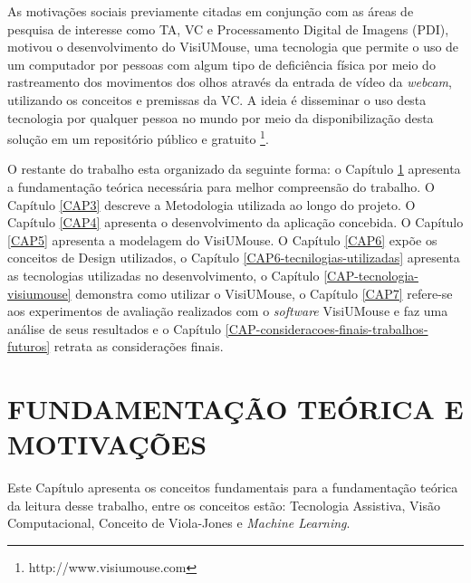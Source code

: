 As motivações sociais previamente citadas em conjunção com as áreas de pesquisa de interesse como TA, VC e Processamento Digital de Imagens (PDI), motivou o desenvolvimento do VisiUMouse, uma tecnologia que permite o uso de um computador por pessoas com algum tipo de deficiência física por meio do rastreamento dos movimentos dos olhos através da entrada de vídeo da \textit{webcam}, utilizando os conceitos e premissas da VC. A ideia é disseminar o uso desta tecnologia por qualquer pessoa no mundo por meio da disponibilização desta solução em um repositório público e gratuito \footnote{http://www.visiumouse.com}.



O restante do trabalho esta organizado da seguinte forma: o Capítulo \ref{CAP2} apresenta a fundamentação teórica necessária para melhor compreensão do trabalho. O Capítulo \ref{CAP3} descreve a Metodologia utilizada ao longo do projeto. O Capítulo \ref{CAP4} apresenta o desenvolvimento da aplicação concebida. O Capítulo \ref{CAP5} apresenta a modelagem do VisiUMouse. O Capítulo \ref{CAP6} expõe os conceitos de Design utilizados,  o Capítulo \ref{CAP6-tecnilogias-utilizadas} apresenta as tecnologias utilizadas no desenvolvimento, o Capítulo \ref{CAP-tecnologia-visiumouse} demonstra como utilizar o VisiUMouse, o Capítulo \ref{CAP7} refere-se aos experimentos de avaliação realizados com o \textit{software} VisiUMouse e faz uma análise de seus resultados e o Capítulo \ref{CAP-consideracoes-finais-trabalhos-futuros} retrata as considerações finais.


\chapter{FUNDAMENTAÇÃO TEÓRICA E MOTIVAÇÕES}\label{CAP2}
Este Capítulo apresenta os conceitos fundamentais para a fundamentação teórica da leitura desse trabalho, entre os conceitos estão: Tecnologia Assistiva, Visão Computacional, Conceito de Viola-Jones e \textit{Machine Learning}.

